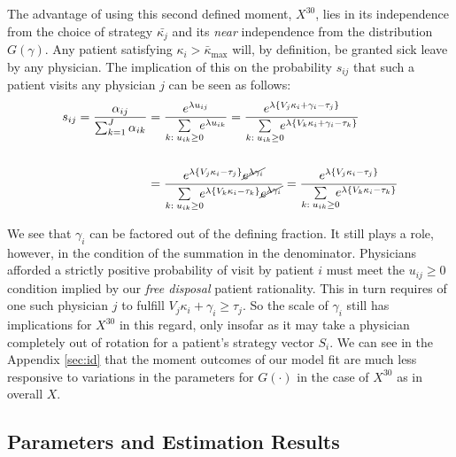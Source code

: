 \documentclass[../main.tex]{subfiles}
\begin{document}
The advantage of using this second defined moment, $X^{30}$, lies in its independence from the choice of strategy $\bar{\kappa_j}$ and its \textit{near} independence from the distribution $G(\gamma)$. Any patient satisfying $\kappa_i > \bar{\kappa}_{\max}$ will, by definition, be granted sick leave by any physician. The implication of this on the probability $s_{ij}$ that such a patient visits any physician $j$ can be seen as follows:
\begin{align*}
    s_{ij} = \frac{\alpha_{ij}}{\sum_{k = 1}^{J} \alpha_{ik}} & =
    \frac{e^{\lambda u_{ij}}}{\sum\limits_{k : \; u_{ik} \geq 0} \hspace{-0.5em} e^{\lambda u_{ik}}} 
    =
    \frac{e^{\lambda \{V_j \kappa_i + \gamma_i - \tau_j \}}}{\sum\limits_{k : \; u_{ik} \geq 0} \hspace{-0.5em} e^{\lambda \{V_k \kappa_i + \gamma_i - \tau_k \}}} \\
    \\ 
   & = \frac{e^{\lambda \{V_j \kappa_i - \tau_j \}} \cancel{e^{\lambda \gamma_i}}}{\sum\limits_{k : \; u_{ik} \geq 0} \hspace{-0.5em} e^{\lambda \{V_k \kappa_i  - \tau_k \}} \cancel{e^{\lambda\gamma_i}}} =
    \frac{e^{\lambda \{V_j \kappa_i - \tau_j \}}}{\sum\limits_{k : \; u_{ik} \geq 0} \hspace{-0.5em} e^{\lambda \{V_k \kappa_i - \tau_k \}}}
\end{align*}

We see that $\gamma_i$ can be factored out of the defining fraction. It still plays a role, however, in the condition of the summation in the denominator. Physicians afforded a strictly positive probability of visit by patient $i$ must meet the $u_{ij} \geq 0$ condition implied by our \textit{free disposal} patient rationality. This in turn requires of one such physician $j$ to fulfill $V_j \kappa_i + \gamma_i \geq \tau_j$. So the scale of $\gamma_i$ still has implications for $X^{30}$ in this regard, only insofar as it may take a physician completely out of rotation for a patient's strategy vector $S_i$. We can see in the Appendix \ref{sec:id} that the moment outcomes of our model fit are much less responsive to variations in the parameters for $G(\cdot)$ in the case of $X^{30}$ as in overall $X$.


\subsection{Parameters and Estimation Results}
\end{document}
